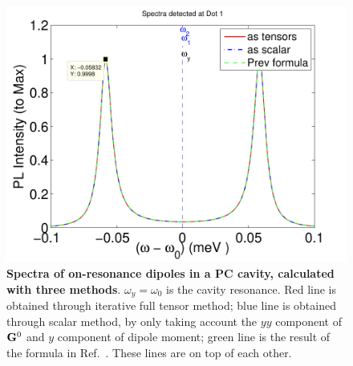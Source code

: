 \begin{figure}[H]
\centering
\begin{center}
\includegraphics[width=14cm]{./Figs/sp84_11_3}
\end{center}
\caption[Spectra of on-resonance dipoles, with three calculation methods.]{\textbf{Spectra of on-resonance dipoles in a PC cavity, calculated with three methods}. $\omega_y=\omega_0$ is the cavity resonance. Red line is obtained through iterative full tensor method; blue line is obtained through scalar method, by only taking account the $yy$ component of $\mathbf{G}^0$ and $y$ component of dipole moment; green line is the result of the formula in Ref.~\cite{Yao2009c}. These lines are on top of each other.}
\label{sp84_11_3}
\end{figure}


